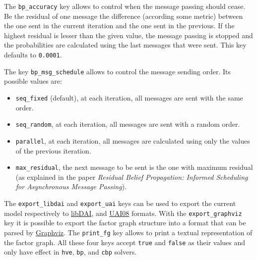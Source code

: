 \documentclass{article}
\begin{document}
The \texttt{bp\_accuracy} key allows to control when the message passing should cease. Be the residual of one message the difference (according some metric) between the one sent in the current iteration and the one sent in the previous. If the highest residual is lesser than the given value, the message passing is stopped and the probabilities are calculated using the last messages that were sent. This key defaults to \texttt{0.0001}.

The key \texttt{bp\_msg\_schedule} allows to control the message sending order. Its possible values are:
\begin{itemize}
 \item \texttt{seq\_fixed} (default), at each iteration, all messages are sent with the same order.

 \item \texttt{seq\_random}, at each iteration, all messages are sent with a random order.

 \item \texttt{parallel}, at each iteration, all messages are calculated using only the values of the previous iteration.

 \item \texttt{max\_residual}, the next message to be sent is the one with maximum residual (as explained in the paper \textit{Residual Belief Propagation: Informed Scheduling for Asynchronous Message Passing}).
\end{itemize}

The \texttt{export\_libdai} and \texttt{export\_uai} keys can be used to export the current model respectively to \href{http://cs.ru.nl/~jorism/libDAI/doc/fileformats.html}{libDAI}, and \href{http://graphmod.ics.uci.edu/uai08/FileFormat}{UAI08} formats. With the \texttt{export\_graphviz} key it is possible to export the factor graph structure into a format that can be parsed by \href{http://www.graphviz.org/}{Graphviz}. The \texttt{print\_fg} key allows to print a textual representation of the factor graph. All these four keys accept \texttt{true} and \texttt{false} as their values and only have effect in \texttt{hve}, \texttt{bp}, and \texttt{cbp} solvers.



\end{document}

